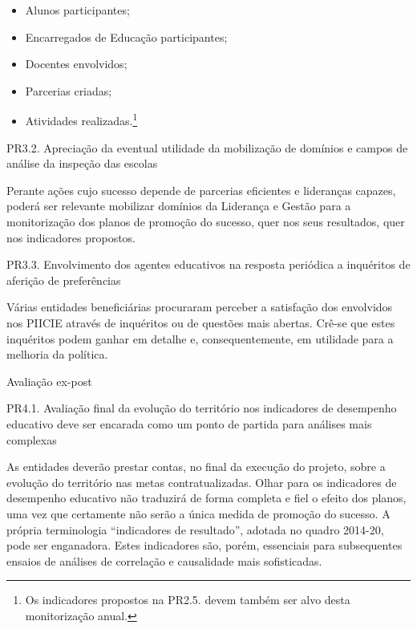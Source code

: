 \documentclass[
]{book}
\providecommand{\tightlist}{%
  \setlength{\itemsep}{0pt}\setlength{\parskip}{0pt}}
\begin{document}
\begin{itemize}
\tightlist
\item
  Alunos participantes;\\
\item
  Encarregados de Educação participantes;\\
\item
  Docentes envolvidos;\\
\item
  Parcerias criadas;\\
\item
  Atividades realizadas.\footnote{Os indicadores propostos na PR2.5. devem também ser alvo desta monitorização anual.}
\end{itemize}

\leavevmode{}%
PR3.2. Apreciação da eventual utilidade da mobilização de domínios e campos de análise da inspeção das escolas

Perante ações cujo sucesso depende de parcerias eficientes e lideranças capazes, poderá ser relevante mobilizar domínios da Liderança e Gestão para a monitorização dos planos de promoção do sucesso, quer nos seus resultados, quer nos indicadores propostos.

\leavevmode{}%
PR3.3. Envolvimento dos agentes educativos na resposta periódica a inquéritos de aferição de preferências

Várias entidades beneficiárias procuraram perceber a satisfação dos envolvidos nos PIICIE através de inquéritos ou de questões mais abertas. Crê-se que estes inquéritos podem ganhar em detalhe e, consequentemente, em utilidade para a melhoria da política.

\leavevmode{}%
Avaliação ex-post

\leavevmode{}%
PR4.1. Avaliação final da evolução do território nos indicadores de desempenho educativo deve ser encarada como um ponto de partida para análises mais complexas

As entidades deverão prestar contas, no final da execução do projeto, sobre a evolução do território nas metas contratualizadas. Olhar para os indicadores de desempenho educativo não traduzirá de forma completa e fiel o efeito dos planos, uma vez que certamente não serão a única medida de promoção do sucesso. A própria terminologia ``indicadores de resultado'', adotada no quadro 2014-20, pode ser enganadora. Estes indicadores são, porém, essenciais para subsequentes ensaios de análises de correlação e causalidade mais sofisticadas.
\end{document}
